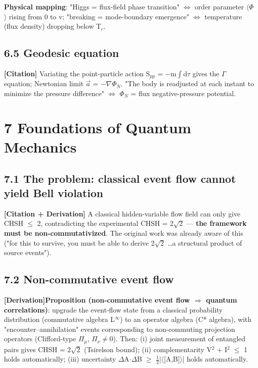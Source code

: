 \documentclass[12pt]{article}
\newcommand{\mtag}[1]{\textbf{[#1]}}
\newcommand{\up}[1]{\ensuremath{^{#1}}}
\newcommand{\down}[1]{\ensuremath{_{#1}}}
\begin{document}
\textbf{Physical mapping}: "Higgs = flux-field phase transition" \ensuremath{\iff} order parameter \ensuremath{\langle}\ensuremath{\Phi}\ensuremath{\rangle} rising from 0 to v; "breaking = mode-boundary emergence" \ensuremath{\iff} temperature (flux density) dropping below T\down{c}.

\subsection{6.5 Geodesic equation}

\mtag{Citation} Variating the point-particle action S\down{pp} = \ensuremath{-}m\ensuremath{\int}d\ensuremath{\tau} gives the \ensuremath{\Gamma} equation; Newtonian limit \ensuremath{\vec{a}} = \ensuremath{-}\ensuremath{\nabla}\ensuremath{\Phi}\down{N}. "The body is readjusted at each instant to minimize the pressure difference" \ensuremath{\iff} \ensuremath{\Phi}\down{N} = flux negative-pressure potential.



\section{7 Foundations of Quantum Mechanics}

\subsection{7.1 The problem: classical event flow cannot yield Bell violation}

\mtag{Citation + Derivation} A classical hidden-variable flow field can only give CHSH \ensuremath{\leq} 2, contradicting the experimental CHSH = 2\ensuremath{\sqrt{2}} --- \textbf{the framework must be non-commutativized}. The original work was already aware of this ("for this to survive, you must be able to derive 2\ensuremath{\sqrt{2}} \ldots a structural product of source events").

\subsection{7.2 Non-commutative event flow}

\mtag{Derivation}\textbf{Proposition (non-commutative event flow \ensuremath{\Rightarrow} quantum correlations)}: upgrade the event-flow state from a classical probability distribution (commutative algebra L\up{\infty{}}) to an operator algebra (C* algebra), with "encounter--annihilation" events corresponding to non-commuting projection operators (Clifford-type {\ensuremath{\Pi}\down{\mu{}}, \ensuremath{\Pi}\down{\nu{}}}\ensuremath{\neq}0). Then:
(i) joint measurement of entangled pairs gives CHSH = 2\ensuremath{\sqrt{2}} (Tsirelson bound);
(ii) complementarity V\up{2} + I\up{2} \ensuremath{\leq} 1 holds automatically;
(iii) uncertainty \ensuremath{\Delta}A\ensuremath{\cdot}\ensuremath{\Delta}B \ensuremath{\geq} \ensuremath{\tfrac12}|\ensuremath{\langle}[A,B]\ensuremath{\rangle}| holds automatically.
\end{document}
